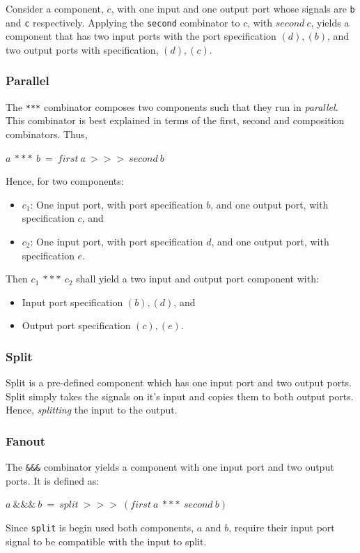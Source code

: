 Consider a component, $c$, with one input and one output port whose signals are \texttt{b} and \texttt{c} respectively. Applying the \texttt{second} combinator to $c$, with $second\ c$, yields a component that has two input ports with the port specification $(d), (b)$, and two output ports with specification, $(d), (c)$.

\subsubsection{Parallel}
The \texttt{***} combinator composes two components such that they run in \emph{parallel}. This combinator is best explained in terms of the first, second and composition combinators. Thus,
\begin{center}
$a\ ***\ b\ =\ first\ a\ >>>\ second\ b$
\end{center}
Hence, for two components:
\begin{itemize}
\item $c_1$: One input port, with port specification $b$, and one output port, with specification $c$, and
\item $c_2$: One input port, with port specification $d$, and one output port, with specification $e$.
\end{itemize}
Then $c_1\ ***\ c_2$ shall yield a two input and output port component with:
\begin{itemize}
\item Input port specification $(b), (d)$, and
\item Output port specification $(c), (e)$.
\end{itemize}

\subsubsection{Split}
Split is a pre-defined component which has one input port and two output ports. Split simply takes the signals on it's input and copies them to both output ports. Hence, \emph{splitting} the input to the output.

\subsubsection{Fanout}
The \texttt{\&\&\&} combinator yields a component with one input port and two output ports. It is defined as:
\begin{center}
$a\ \&\&\&\ b\ =\ split\ >>>\ (first\ a\ ***\ second\ b)$
\end{center}
Since \texttt{split} is begin used both components, $a$ and $b$, require their input port signal to be compatible with the input to split.

